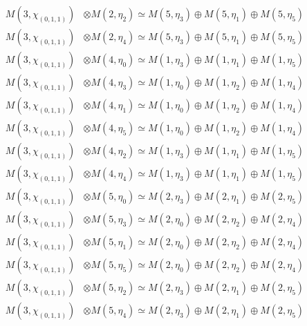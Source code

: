\begin{align*}
M(3,\chi_{(0,1,1)}) &\otimes M(2,\eta_{2}) \simeq M(5,\eta_{3}) \oplus M(5,\eta_{1}) \oplus M(5,\eta_{5})\\
M(3,\chi_{(0,1,1)}) &\otimes M(2,\eta_{4}) \simeq M(5,\eta_{3}) \oplus M(5,\eta_{1}) \oplus M(5,\eta_{5})\\
M(3,\chi_{(0,1,1)}) &\otimes M(4,\eta_{0}) \simeq M(1,\eta_{3}) \oplus M(1,\eta_{1}) \oplus M(1,\eta_{5})\\
M(3,\chi_{(0,1,1)}) &\otimes M(4,\eta_{3}) \simeq M(1,\eta_{0}) \oplus M(1,\eta_{2}) \oplus M(1,\eta_{4})\\
M(3,\chi_{(0,1,1)}) &\otimes M(4,\eta_{1}) \simeq M(1,\eta_{0}) \oplus M(1,\eta_{2}) \oplus M(1,\eta_{4})\\
M(3,\chi_{(0,1,1)}) &\otimes M(4,\eta_{5}) \simeq M(1,\eta_{0}) \oplus M(1,\eta_{2}) \oplus M(1,\eta_{4})\\
M(3,\chi_{(0,1,1)}) &\otimes M(4,\eta_{2}) \simeq M(1,\eta_{3}) \oplus M(1,\eta_{1}) \oplus M(1,\eta_{5})\\
M(3,\chi_{(0,1,1)}) &\otimes M(4,\eta_{4}) \simeq M(1,\eta_{3}) \oplus M(1,\eta_{1}) \oplus M(1,\eta_{5})\\
M(3,\chi_{(0,1,1)}) &\otimes M(5,\eta_{0}) \simeq M(2,\eta_{3}) \oplus M(2,\eta_{1}) \oplus M(2,\eta_{5})\\
M(3,\chi_{(0,1,1)}) &\otimes M(5,\eta_{3}) \simeq M(2,\eta_{0}) \oplus M(2,\eta_{2}) \oplus M(2,\eta_{4})\\
M(3,\chi_{(0,1,1)}) &\otimes M(5,\eta_{1}) \simeq M(2,\eta_{0}) \oplus M(2,\eta_{2}) \oplus M(2,\eta_{4})\\
M(3,\chi_{(0,1,1)}) &\otimes M(5,\eta_{5}) \simeq M(2,\eta_{0}) \oplus M(2,\eta_{2}) \oplus M(2,\eta_{4})\\
M(3,\chi_{(0,1,1)}) &\otimes M(5,\eta_{2}) \simeq M(2,\eta_{3}) \oplus M(2,\eta_{1}) \oplus M(2,\eta_{5})\\
M(3,\chi_{(0,1,1)}) &\otimes M(5,\eta_{4}) \simeq M(2,\eta_{3}) \oplus M(2,\eta_{1}) \oplus M(2,\eta_{5})\\
\end{align*}


